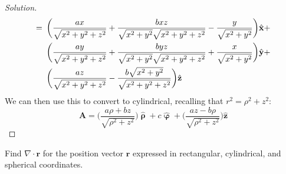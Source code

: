 \begin{proof}[Solution]
\begin{align*}
                    =\hspace{0.5em}
                    &\bigg(
                        \frac{ax}{\sqrt{x^{2}+y^{2}+z^{2}}}
                        +\frac{bxz}
                              {\sqrt{x^{2}+y^{2}}
                               \sqrt{x^{2}+y^{2}+z^{2}}}
                        -\frac{y}{\sqrt{x^{2}+y^{2}}}
                    \bigg)\hat{\mathbf{x}}+\\
                    &\bigg(
                        \frac{ay}{\sqrt{x^{2}+y^{2}+z^{2}}}
                        +\frac{byz}
                              {\sqrt{x^{2}+y^{2}}
                               \sqrt{x^{2}+y^{2}+z^{2}}}
                            +\frac{x}{\sqrt{x^{2}+y^{2}}}
                    \bigg)\hat{\mathbf{y}}+\\
                    &\bigg(
                        \frac{az}{\sqrt{x^{2}+y^{2}+z^{2}}}
                        -\frac{b\sqrt{x^{2}+y^{2}}}
                              {\sqrt{x^{2}+y^{2}+z^{2}}}
                    \bigg)
                    \hat{\mathbf{z}}
                \end{align*}
                We can then use this to convert to cylindrical,
                recalling that $r^{2}=\rho^{2}+z^{2}$:
                \begin{equation*}
                    \mathbf{A}
                    =\bigg(
                        \frac{a\rho+bz}{\sqrt{\rho^{2}+z^{2}}}
                    \bigg)
                    \hat{\boldsymbol{\uprho}}
                    +c\hat{\boldsymbol{\upvarphi}}
                    +\bigg(
                        \frac{az-b\rho}{\sqrt{\rho^{2}+z^{2}}}
                    \bigg)\hat{\mathbf{z}}
                \end{equation*}
            \end{proof}
            \begin{problem}[Wangsness 1-21]
                Find $\nabla\cdot\mathbf{r}$ for the position
                vector $\mathbf{r}$ expressed in rectangular,
                cylindrical, and spherical coordinates.
            \end{problem}
